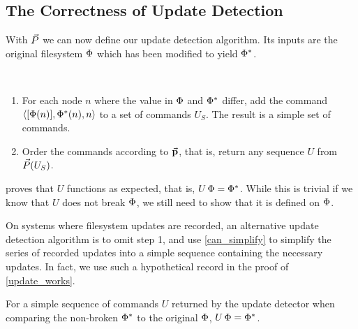 
\subsection{The Correctness of Update Detection}

With $\vec{P}$ we can now define our update detection algorithm.
Its inputs are the original filesystem $\Phi$ which has been modified to yield $\Phi^*$.
\begin{mydef}~
\begin{enumerate}
    \item For each node $n$ where the value in $\Phi$ and $\Phi^*$ differ, add the command $\langle{[\Phi(n)],\Phi^*(n),n}\rangle$ to
        a set of commands $U_S$. The result is a simple set of commands.
    \item Order the commands according to $\mathrel{\vec{\mathbf{p}}}$, that is, 
        return any sequence $U$ from $\vec{P}({U_S})$.
\end{enumerate}
\end{mydef}

 proves that $U$ functions as expected, that is, $U\,\Phi=\Phi^*$.
While this is trivial if we know that $U$ does not break $\Phi$, we
still need to show that it is defined on $\Phi$.

On systems where filesystem updates are recorded,
an alternative update detection algorithm is to
omit step 1, and use \cref{can_simplify} to simplify the series of recorded updates
into a simple sequence containing the necessary updates.
In fact, we use such a hypothetical record in the proof of \cref{update_works}.


\begin{myth}
For a simple sequence of commands $U$ returned by the update detector
when comparing the non-broken $\Phi^*$ to the original $\Phi$,
$U\,\Phi = \Phi^*$.
\end{myth}


